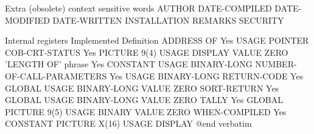 Extra (obsolete) context sensitive words
AUTHOR
DATE-COMPILED
DATE-MODIFIED
DATE-WRITTEN
INSTALLATION
REMARKS
SECURITY


Internal registers              Implemented     Definition
ADDRESS OF                      Yes             USAGE POINTER
COB-CRT-STATUS                  Yes             PICTURE 9(4) USAGE DISPLAY VALUE ZERO
'LENGTH OF' phrase              Yes             CONSTANT USAGE BINARY-LONG
NUMBER-OF-CALL-PARAMETERS       Yes             USAGE BINARY-LONG
RETURN-CODE                     Yes             GLOBAL USAGE BINARY-LONG VALUE ZERO
SORT-RETURN                     Yes             GLOBAL USAGE BINARY-LONG VALUE ZERO
TALLY                           Yes             GLOBAL PICTURE 9(5) USAGE BINARY VALUE ZERO
WHEN-COMPILED                   Yes             CONSTANT PICTURE X(16) USAGE DISPLAY
@end verbatim
